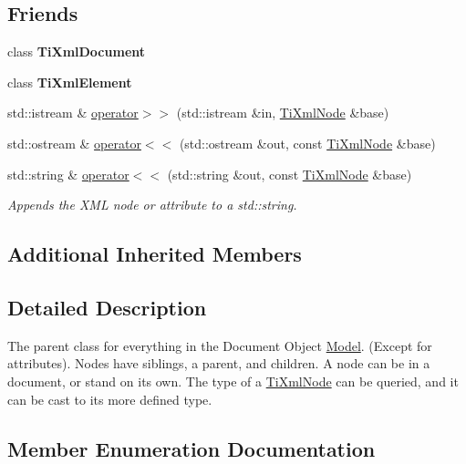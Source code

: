 \subsection*{Friends}
\begin{DoxyCompactItemize}
\item 
\mbox{\label{class_ti_xml_node_a173617f6dfe902cf484ce5552b950475}} 
class {\bfseries Ti\+Xml\+Document}
\item 
\mbox{\label{class_ti_xml_node_ab6592e32cb9132be517cc12a70564c4b}} 
class {\bfseries Ti\+Xml\+Element}
\item 
std\+::istream \& \hyperlink{class_ti_xml_node_ab57bd426563c926844f65a78412e18b9}{operator$>$$>$} (std\+::istream \&in, \hyperlink{class_ti_xml_node}{Ti\+Xml\+Node} \&base)
\item 
std\+::ostream \& \hyperlink{class_ti_xml_node_a86cd49cfb17a844c0010b3136ac966c7}{operator$<$$<$} (std\+::ostream \&out, const \hyperlink{class_ti_xml_node}{Ti\+Xml\+Node} \&base)
\item 
\mbox{\label{class_ti_xml_node_a52ef17e7080df2490cf87bde380685ab}} 
std\+::string \& \hyperlink{class_ti_xml_node_a52ef17e7080df2490cf87bde380685ab}{operator$<$$<$} (std\+::string \&out, const \hyperlink{class_ti_xml_node}{Ti\+Xml\+Node} \&base)
\begin{DoxyCompactList}\small\item\em Appends the X\+ML node or attribute to a std\+::string. \end{DoxyCompactList}\end{DoxyCompactItemize}
\subsection*{Additional Inherited Members}


\subsection{Detailed Description}
The parent class for everything in the Document Object \hyperlink{class_model}{Model}. (Except for attributes). Nodes have siblings, a parent, and children. A node can be in a document, or stand on its own. The type of a \hyperlink{class_ti_xml_node}{Ti\+Xml\+Node} can be queried, and it can be cast to its more defined type. 

\subsection{Member Enumeration Documentation}
\mbox{\label{class_ti_xml_node_a836eded4920ab9e9ef28496f48cd95a2}} 
